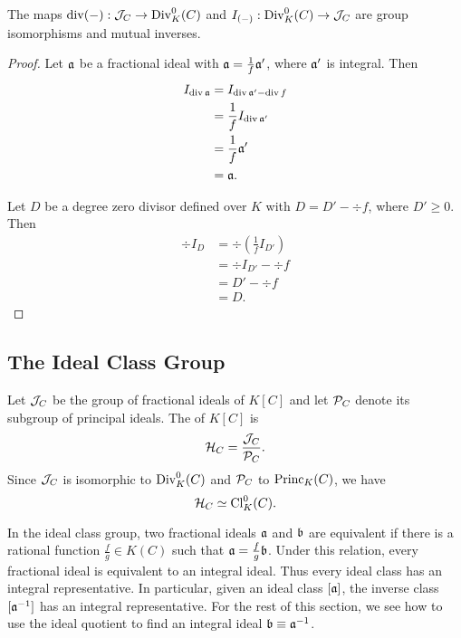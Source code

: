 \begin{theorem}
  The maps $\div(-) : \cal J_C \to \Div_K^0(C)$ and $I_{(-)} : \Div_K^0(C) \to \cal J_C$
  are group isomorphisms and mutual inverses.
\end{theorem}
\begin{proof}
  Let $\frak a$ be a fractional ideal with
  $\frak a = \frac 1 f \frak a'$,
  where $\frak a'$ is integral. Then
  \begin{align*}
    I_{\div \frak a}
      &= I_{\div \frak a' - \div f} \\
      &= \frac 1 f I_{\div \frak a'} \\
      &= \frac 1 f \frak a' \\
      &= \frak a.
  \end{align*}
  
  Let $D$ be a degree zero divisor defined over $K$ with
  $D = D' - \div f$, where $D' \geq 0$. Then
  \begin{align*}
    \div I_D
      &= \div \left( \frac 1 f I_{D'} \right) \\
      &= \div I_{D'} - \div f \\
      &= D' - \div f \\
      &= D.
  \end{align*}
\end{proof}




\subsection{The Ideal Class Group}

Let $\cal J_C$ be the group of fractional ideals of $K[C]$ and let $\cal P_C$ denote its subgroup of principal ideals.
The  of $K[C]$ is
\[ \cal H_C = \frac {\cal J_C} {\cal P_C}. \]
Since $\cal J_C$ is isomorphic to $\Div_K^0(C)$ and $\cal P_C$ to $\Princ_K(C)$, we have
\[ \cal H_C \simeq \Cl_K^0(C). \]

In the ideal class group, two fractional ideals $\frak a$ and $\frak b$ are equivalent
if there is a rational function $\frac f g \in K(C)$ such that $\frak a = \frac f g \frak b$.
Under this relation, every fractional ideal is equivalent to an integral ideal.
Thus every ideal class has an integral representative.
In particular, given an ideal class $[\frak a]$, the inverse class $[\frak a\inv]$ has an integral representative.
For the rest of this section, we see how to use the ideal quotient to find an integral ideal $\frak b \equiv \frak a \inv$.

